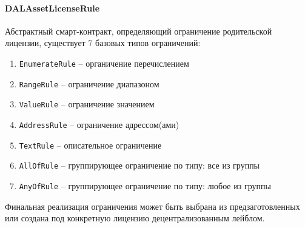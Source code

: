 \documentclass[12pt]{report}
\def\code#1{\colorbox{light-gray}{\texttt{#1}}}
\begin{document}
\paragraph{DALAssetLicenseRule}\hfill\null\linebreak
\begin{multicols}{2}
Абстрактный смарт-контракт, определяющий ограничение родительской лицензии, существует 7 базовых типов ограничений:
\begin{enumerate}
	\item \code{EnumerateRule} – органичение перечислением
	\item \code{RangeRule} – ограничение диапазоном
	\item \code{ValueRule} – ограничение значением
	\item \code{AddressRule} – ограничение адрессом(ами)
	\item \code{TextRule} – описательное ограничение 
	\item \code{AllOfRule} – группирующее ограничение по типу: все из группы
	\item \code{AnyOfRule} – группирующее ограничение по типу: любое из группы
\end{enumerate}

Финальная реализация ограничения может быть выбрана из предзаготовленных или создана под конкретную лицензию децентрализованным лейблом.
\end{multicols}
\end{document}
